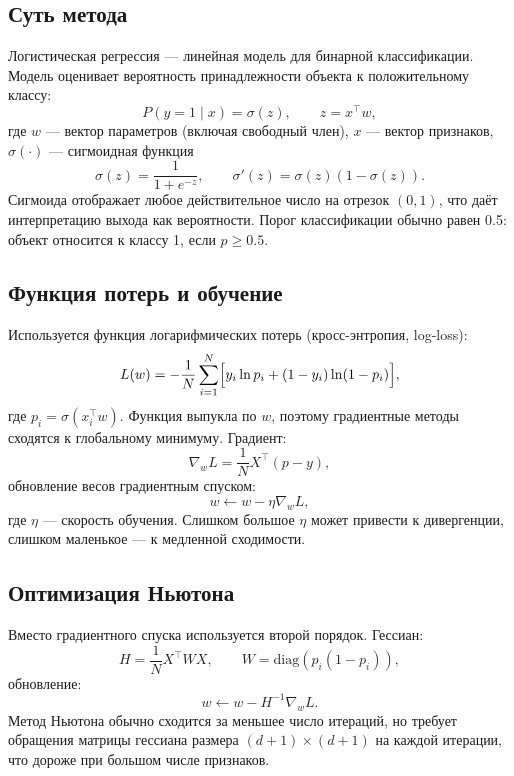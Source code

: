\documentclass[12pt,a4paper]{article}
\begin{document}
\subsection{Суть метода}
Логистическая регрессия --- линейная модель для бинарной классификации. Модель оценивает вероятность принадлежности объекта к положительному классу:
\begin{equation}
P(y=1 \mid x) = \sigma(z), \qquad z = x^\top w,
\end{equation}
где $w$ --- вектор параметров (включая свободный член), $x$ --- вектор признаков, $\sigma(\cdot)$ --- сигмоидная функция
\begin{equation}
\sigma(z) = \frac{1}{1 + e^{-z}}, \qquad \sigma'(z) = \sigma(z)(1-\sigma(z)).
\end{equation}
Сигмоида отображает любое действительное число на отрезок $(0,1)$, что даёт интерпретацию выхода как вероятности. Порог классификации обычно равен 0.5: объект относится к классу 1, если $p \ge 0.5$.

\subsection{Функция потерь и обучение}
Используется функция логарифмических потерь (кросс-энтропия, log-loss):
\begin{equation}
L(w) = -\frac{1}{N}\sum_{i=1}^{N}\Bigl[y_i\ln p_i + (1-y_i)\ln(1-p_i)\Bigr],
\end{equation}
где $p_i = \sigma(x_i^\top w)$. Функция выпукла по $w$, поэтому градиентные методы сходятся к глобальному минимуму. Градиент:
\begin{equation}
\nabla_w L = \frac{1}{N}X^\top(p-y),
\end{equation}
обновление весов градиентным спуском:
\begin{equation}
w \leftarrow w - \eta \nabla_w L,
\end{equation}
где $\eta$ --- скорость обучения. Слишком большое $\eta$ может привести к дивергенции, слишком маленькое --- к медленной сходимости.

\subsection{Оптимизация Ньютона}
Вместо градиентного спуска используется второй порядок. Гессиан:
\begin{equation}
H = \frac{1}{N}X^\top W X, \qquad W = \mathrm{diag}(p_i(1-p_i)),
\end{equation}
обновление:
\begin{equation}
w \leftarrow w - H^{-1}\nabla_w L.
\end{equation}
Метод Ньютона обычно сходится за меньшее число итераций, но требует обращения матрицы гессиана размера $(d+1)\times(d+1)$ на каждой итерации, что дороже при большом числе признаков.
\end{document}
